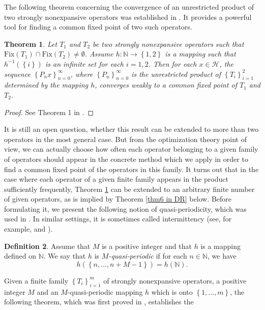\documentclass[]{interact}
\theoremstyle{plain}%
\newtheorem{theorem}{Theorem}[section]
\theoremstyle{definition}
\newtheorem{definition}[theorem]{Definition}
\theoremstyle{remark}
\begin{document}
The following theorem concerning the convergence of an \color{black}unrestricted \color{black} product
of two strongly nonexpansive operators was established in \cite{key-1}.
It provides a powerful tool for finding a common fixed point of two
such operators.
\begin{theorem}
\label{DR Theorem}Let $T_{1}$ and $T_{2}$ be two strongly nonexpansive
operators such that $\mathrm{Fix}(T_{1})\cap\mathrm{Fix}(T_{2})\not=\emptyset$.
Assume $h:\mathbb{N\rightarrow}\left\{ 1,2\right\} $ is a mapping
such that $h^{-1}\left(\left\{ i\right\} \right)$ is an infinite
set for each $i=1,2$. Then for each $x\in\mathcal{H}$, the sequence
$\left\{ P_{n}x\right\} _{n=0}^{\infty}$, where $\left\{ P_{n}\right\} _{n=0}^{\infty}$
is the \color{black}unrestricted \color{black} product of $\left\{ T_{i}\right\} _{i=1}^{2}$ determined
by the mapping $h$, converges weakly to a common fixed point of $T_{1}$
and $T_{2}$.
\end{theorem}
\begin{proof}
See Theorem 1 in \cite{key-1}.
\end{proof}
It is still an open question, whether this result can be extended
to more than two operators in the most general case. But from the
optimization theory point of view, we can actually choose how often
each operator belonging to a given family of operators should appear
in the concrete method which we apply in order to find a common fixed point
of the operators in this family. It turns out that in the case where each operator of a given
finite family appears in the product sufficiently frequently, Theorem
\ref{DR Theorem} can be extended to an arbitrary finite number of
given operators, as is implied by Theorem \ref{thm6 in DR} below.
Before formulating it, we present the following notion
of quasi-periodicity, which was used in \cite{key-1}. In similar
settings, it is sometimes called intermittency (see, for example,
\cite{key-23} and \cite{key-20}).
\begin{definition}
Assume that $M$ is a positive integer and that $h$ is a mapping
defined on $\mathbb{N}$. We say that $h$ is \textit{$M$-quasi-periodic
}if for each $n\in\mathbb{N}$, we have
\[
h\left(\left\{ n,\dots,n+M-1\right\} \right)=h\left(\mathbb{N}\right).
\]
\end{definition}
Given a finite family $\left\{ T_{i}\right\} _{i=1}^{m}$ of strongly
nonexpansive operators, a positive integer $M$ and an $M$-quasi-periodic
mapping $h$ which is onto $\left\{ 1,\dots,m\right\} $, the following
theorem, which was first proved in \cite{key-1}, establishes the
\end{document}
